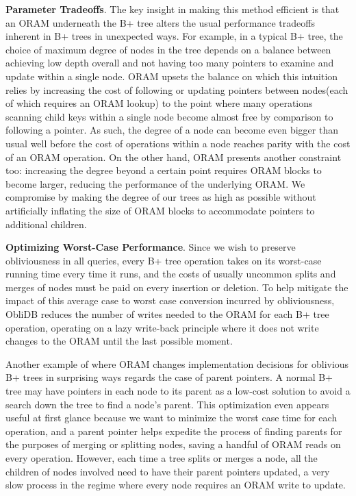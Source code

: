 \documentclass[letterpaper,twocolumn,10pt]{article}
\def\name/{ObliDB}
\begin{document}
\noindent \textbf{Parameter Tradeoffs}. The key insight in making this method efficient is that an ORAM underneath the B+ tree alters the usual performance tradeoffs inherent in B+ trees in unexpected ways. For example, in a typical B+ tree, the choice of maximum degree of nodes in the tree depends on a balance between achieving low depth overall and not having too many pointers to examine and update within a single node. ORAM upsets the balance on which this intuition relies by increasing the cost of following or updating pointers between nodes(each of which requires an ORAM lookup) to the point where many operations scanning child keys within a single node become almost free by comparison to following a pointer. As such, the degree of a node can become even bigger than usual well before the cost of operations within a node reaches parity with the cost of an ORAM operation. On the other hand, ORAM presents another constraint too: increasing the degree beyond a certain point requires ORAM blocks to become larger, reducing the performance of the underlying ORAM. We compromise by making the degree of our trees as high as possible without artificially inflating the size of ORAM blocks to accommodate pointers to additional children.

\noindent \textbf{Optimizing Worst-Case Performance}. Since we wish to preserve obliviousness in all queries, every B+ tree operation takes on its worst-case running time every time it runs, and the costs of usually uncommon splits and merges of nodes must be paid on every insertion or deletion. To help mitigate the impact of this average case to worst case conversion incurred by obliviousness, \name/ reduces the number of writes needed to the ORAM for each B+ tree operation, operating on a lazy write-back principle where it does not write changes to the ORAM until the last possible moment.

Another example of where ORAM changes implementation decisions for oblivious B+ trees in surprising ways regards the case of parent pointers. A normal B+ tree may have pointers in each node to its parent as a low-cost solution to avoid a search down the tree to find a node's parent. This optimization even appears useful at first glance because we want to minimize the worst case time for each operation, and a parent pointer helps expedite the process of finding parents for the purposes of merging or splitting nodes, saving a handful of ORAM reads on every operation. However, each time a tree splits or merges a node, all the children of nodes involved need to have their parent pointers updated, a very slow process in the regime where every node requires an ORAM write to update.
\end{document}
